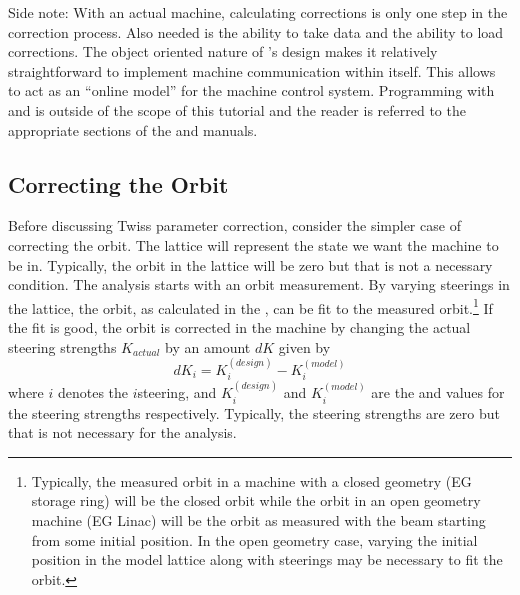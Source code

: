 \documentclass{hitec}     %
\begin{document}
{Side note: With an actual machine, calculating corrections is only one step in the correction
process. Also needed is the ability to take data and the ability to load corrections. The object
oriented nature of \tao's design makes it relatively straightforward to implement machine
communication within \tao itself. This allows \tao to act as an ``online model'' for the machine
control system. Programming with \bmad and \tao is outside of the scope of this tutorial and the
reader is referred to the appropriate sections of the \bmad and \tao manuals.

\subsection{Correcting the Orbit}
\label{s:cor.orbit}

Before discussing Twiss parameter correction, consider the simpler case of correcting the orbit. The
 lattice will represent the state we want the machine to be in. Typically, the orbit in
the  lattice will be zero but that is not a necessary condition. The analysis starts
with an orbit measurement. By varying steerings in the  lattice, the orbit, as calculated
in the , can be fit to the measured orbit.\footnote
  {
Typically, the measured orbit in a machine with a closed geometry (EG storage ring) will be the
closed orbit while the orbit in an open geometry machine (EG Linac) will be the orbit as measured
with the beam starting from some initial position. In the open geometry case, varying the initial
position in the model lattice along with steerings may be necessary to fit the orbit.
  }
If the fit is good, the orbit is corrected in
the machine by changing the actual steering strengths $K_{actual}$ by an amount $dK$ given by
\begin{equation}
  dK_{i} = K_{i}^{(design)} - K_{i}^{(model)}
  \label{dkkk}
\end{equation}
where $i$ denotes the $i$\th steering, and $K_{i}^{(design)}$ and $K_{i}^{(model)}$ are the
 and  values for the steering strengths respectively. Typically, the
 steering strengths are zero but that is not necessary for the analysis.

}
\end{document}
